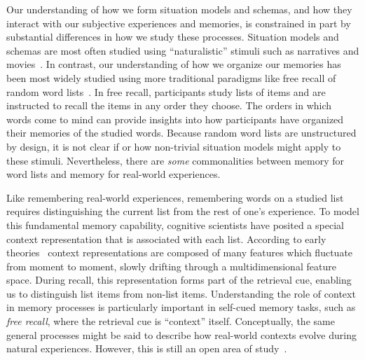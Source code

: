 \documentclass[11pt]{article}
\begin{document}

Our understanding of how we form situation models and schemas, and how they
interact with our subjective experiences and memories, is constrained in part
by substantial differences in how we study these processes. Situation models
and schemas are most often studied using ``naturalistic'' stimuli such as
narratives and movies~\citep{ZwaaEtal95,ZwaaRadv98, NastEtal20}. In contrast,
our understanding of how we organize our memories has been most widely studied
using more traditional paradigms like free recall of random word
lists~\citep{Kaha12, Kaha20}. In free recall, participants study lists of items and are
instructed to recall the items in any order they choose. The orders in which
words come to mind can provide insights into how participants have organized
their memories of the studied words. Because random word lists are unstructured
by design, it is not clear if or how non-trivial situation models might apply
to these stimuli. Nevertheless, there are \textit{some} commonalities between
memory for word lists and memory for real-world experiences.

Like remembering real-world experiences, remembering words on a studied list
requires distinguishing the current list from the rest of one's experience. To
model this fundamental memory capability, cognitive scientists have posited a
special context representation that is associated with each list. According to
early theories~\citep[e.g.][]{Este55a,AndeBowe72} context representations are
composed of many features which fluctuate from moment to moment, slowly
drifting through a multidimensional feature space. During recall, this
representation forms part of the retrieval cue, enabling us to distinguish list
items from non-list items. Understanding the role of context in memory
processes is particularly important in self-cued memory tasks, such as
\textit{free recall}, where the retrieval cue is ``context'' itself.
Conceptually, the same general processes might be said to describe how
real-world contexts evolve during natural experiences. However, this is still
an open area of study~\citep{Mann20, Mann21a}.
\end{document}
